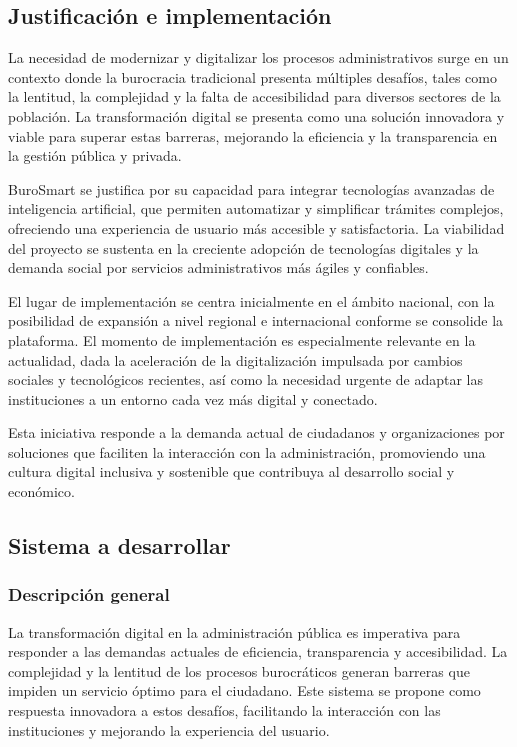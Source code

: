 \subsection{Justificación e implementación}
La necesidad de modernizar y digitalizar los procesos administrativos surge en un contexto donde la burocracia tradicional presenta múltiples desafíos, tales como la lentitud, la complejidad y la falta de accesibilidad para diversos sectores de la población. La transformación digital se presenta como una solución innovadora y viable para superar estas barreras, mejorando la eficiencia y la transparencia en la gestión pública y privada.

BuroSmart se justifica por su capacidad para integrar tecnologías avanzadas de inteligencia artificial, que permiten automatizar y simplificar trámites complejos, ofreciendo una experiencia de usuario más accesible y satisfactoria. La viabilidad del proyecto se sustenta en la creciente adopción de tecnologías digitales y la demanda social por servicios administrativos más ágiles y confiables.

El lugar de implementación se centra inicialmente en el ámbito nacional, con la posibilidad de expansión a nivel regional e internacional conforme se consolide la plataforma. El momento de implementación es especialmente relevante en la actualidad, dada la aceleración de la digitalización impulsada por cambios sociales y tecnológicos recientes, así como la necesidad urgente de adaptar las instituciones a un entorno cada vez más digital y conectado.

Esta iniciativa responde a la demanda actual de ciudadanos y organizaciones por soluciones que faciliten la interacción con la administración, promoviendo una cultura digital inclusiva y sostenible que contribuya al desarrollo social y económico.
 
\subsection{Sistema a desarrollar}

\subsubsection{Descripción general}
La transformación digital en la administración pública es imperativa para responder a las demandas actuales de eficiencia, transparencia y accesibilidad. La complejidad y la lentitud de los procesos burocráticos generan barreras que impiden un servicio óptimo para el ciudadano. Este sistema se propone como respuesta innovadora a estos desafíos, facilitando la interacción con las instituciones y mejorando la experiencia del usuario.

